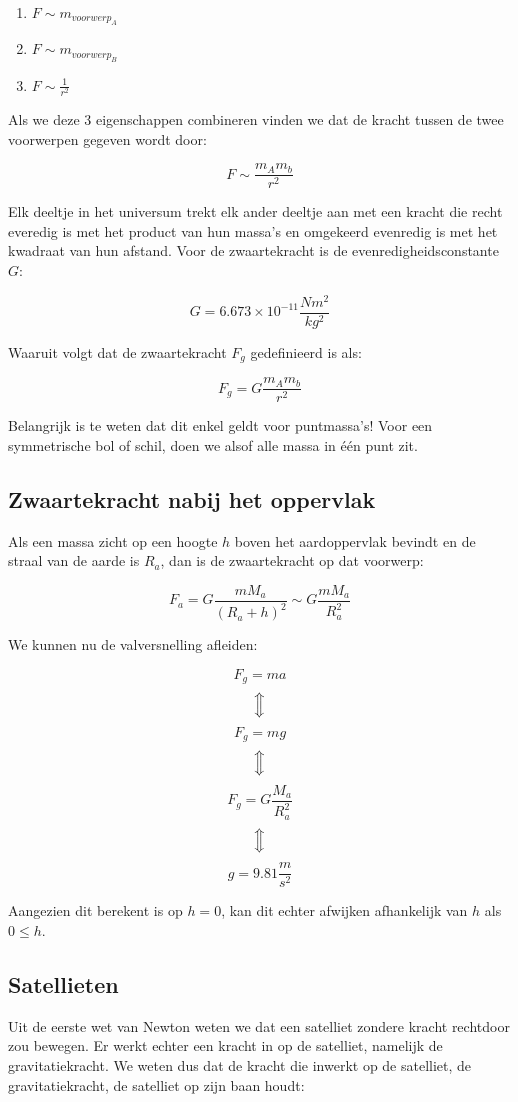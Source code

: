 \documentclass[12pt,a4paper]{article}
\newcommand{\Luda}{\Big\Updownarrow}
\begin{document}
    \begin{enumerate}
    	\item $F \sim m_{voorwerp_{A}}$
    	\item $F \sim m_{voorwerp_{B}}$
    	\item $F \sim \frac{1}{r^{2}}$
    \end{enumerate}
    
    Als we deze 3 eigenschappen combineren vinden we dat de kracht tussen de twee voorwerpen gegeven wordt door:
    
    $$ F \sim \frac{m_{A}m_{b}}{r^{2}} $$

    Elk deeltje in het universum trekt elk ander deeltje aan met een kracht die recht everedig is met het product van hun massa's en omgekeerd
    evenredig is met het kwadraat van hun afstand. Voor de zwaartekracht is de evenredigheidsconstante $G$:
    
    $$ G = 6.673 \times 10^{-11} \frac{Nm^{2}}{kg^{2}} $$ 
    
    Waaruit volgt dat de zwaartekracht $F_{g}$ gedefinieerd is als:
    
    $$ F_{g} = G \frac{m_{A}m_{b}}{r^{2}} $$ 
    
    Belangrijk is te weten dat dit enkel geldt voor puntmassa's! Voor een symmetrische bol of schil, 
    doen we alsof alle massa in één punt zit.
    
    \subsection{Zwaartekracht nabij het oppervlak}
    Als een massa zicht op een hoogte $h$ boven het aardoppervlak bevindt en de straal van de aarde is $R_{a}$, dan is de zwaartekracht op dat voorwerp:
    
    $$ F_{a} = G\frac{mM_{a}}{(R_{a} + h)^{2}} \sim G\frac{mM_{a}}{R_{a}^{2}}$$
    
    We kunnen nu de valversnelling afleiden:
    
    $$ F_{g} = ma $$
    $$\Luda$$
    $$ F_{g} = mg $$
    $$\Luda$$
    $$ F_{g} = G\frac{M_{a}}{R_{a}^{2}} $$
    $$\Luda$$
    $$ g = 9.81 \frac{m}{s^{2}} $$
    
    Aangezien dit berekent is op $h = 0$, kan dit echter afwijken afhankelijk van $h$ als $0 \leq h$. 
    
    \subsection{Satellieten}
    Uit de eerste wet van Newton weten we dat een satelliet zondere kracht rechtdoor zou bewegen. Er werkt echter een kracht in
    op de satelliet, namelijk de gravitatiekracht. We weten dus dat de kracht die inwerkt op de satelliet, de gravitatiekracht, de satelliet
    op zijn baan houdt:
    
\end{document}
